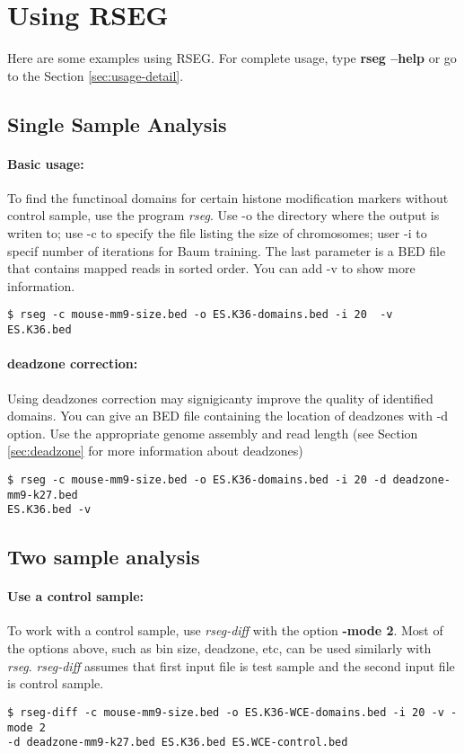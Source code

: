 \documentclass[11pt]{report}
\begin{document}
\section{Using RSEG}
\label{sec:usage}

Here are some examples using RSEG. For complete usage, type \textbf{rseg
 --help} or go to the Section \ref{sec:usage-detail}.

\subsection{Single Sample Analysis}
\label{sec:use-rseg}

\paragraph{Basic usage:} 
To find the functinoal domains for certain histone modification
markers without control sample, use the program \textit{rseg}. Use -o the
directory where the output is writen to; use -c to specify the file
listing the size of chromosomes; user -i to specif number of
iterations for Baum training. The last parameter is a BED file that
contains mapped reads in sorted order. You can add -v to show more
information.
\begin{verbatim}
$ rseg -c mouse-mm9-size.bed -o ES.K36-domains.bed -i 20  -v  ES.K36.bed
\end{verbatim}

\paragraph{deadzone correction:}
Using deadzones correction may signigicanty improve the quality of
identified domains. You can give an BED file containing the location
of deadzones with -d option. Use the appropriate genome assembly and
read length (see Section \ref{sec:deadzone} for more information about
deadzones)
\begin{verbatim}
$ rseg -c mouse-mm9-size.bed -o ES.K36-domains.bed -i 20 -d deadzone-mm9-k27.bed 
ES.K36.bed -v
\end{verbatim}


\subsection{Two sample analysis}
\label{sec:use-rseg-diff}


\paragraph{Use a control sample:}
To work with a control sample, use \textit{rseg-diff} with the option
\textbf{-mode 2}. Most of the options above, such as bin size, deadzone, etc,
can be used similarly with \textit{rseg}. \textit{rseg-diff} assumes that first
input file is test sample and the second input file is control sample.
\begin{verbatim}
$ rseg-diff -c mouse-mm9-size.bed -o ES.K36-WCE-domains.bed -i 20 -v -mode 2
-d deadzone-mm9-k27.bed ES.K36.bed ES.WCE-control.bed
\end{verbatim}
\end{document}
